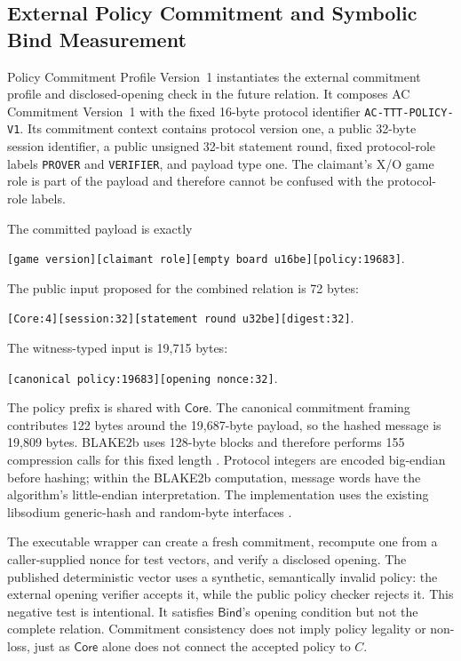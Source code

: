 \subsection{External Policy Commitment and Symbolic Bind Measurement}

Policy Commitment Profile Version~1 instantiates the external commitment
profile and disclosed-opening check in the future relation. It composes AC
Commitment Version~1 with the
fixed 16-byte protocol identifier
\texttt{AC-TTT-POLICY-V1}. Its commitment context contains protocol version
one, a public 32-byte session identifier, a public unsigned 32-bit statement
round, fixed protocol-role labels \texttt{PROVER} and \texttt{VERIFIER}, and
payload type one. The claimant's X/O game role is part of the payload and
therefore cannot be confused with the protocol-role labels.

The committed payload is exactly

\begin{center}
\texttt{[game version][claimant role][empty board u16be][policy:19683]}.
\end{center}

The public input proposed for the combined relation is 72 bytes:

\begin{center}
\texttt{[Core:4][session:32][statement round u32be][digest:32]}.
\end{center}

The witness-typed input is 19,715 bytes:

\begin{center}
\texttt{[canonical policy:19683][opening nonce:32]}.
\end{center}

The policy prefix is shared with \(\mathsf{Core}\). The canonical commitment
framing contributes 122 bytes around the 19,687-byte payload, so the hashed
message is 19,809 bytes. BLAKE2b uses 128-byte blocks and therefore performs
155 compression calls for this fixed length
\cite{saarinen2015blake2}. Protocol integers are encoded big-endian before
hashing; within the BLAKE2b computation, message words have the algorithm's
little-endian interpretation. The implementation uses the existing libsodium
generic-hash and random-byte interfaces
\cite{libsodium-generichash,libsodium-randombytes}.

The executable wrapper can create a fresh commitment, recompute one from a
caller-supplied nonce for test vectors, and verify a disclosed opening. The
published deterministic vector uses a synthetic, semantically invalid policy:
the external opening verifier accepts it, while the public policy checker
rejects it. This negative test is intentional. It satisfies
\(\mathsf{Bind}\)'s opening condition but not the complete relation.
Commitment consistency does not imply policy legality or non-loss, just as
\(\mathsf{Core}\) alone does not connect the accepted policy to \(C\).

